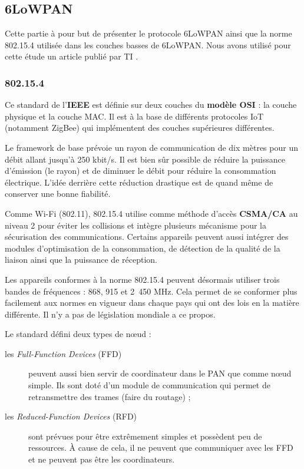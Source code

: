 
\subsection{6LoWPAN}

Cette partie à pour but de présenter le protocole 6LoWPAN ainsi que la norme 802.15.4 utilisée dans les couches basses de 6LoWPAN. Nous avons utilisé pour cette étude un article publié par TI \cite{demystified}.

\subsubsection{802.15.4}

Ce standard de l'\textbf{IEEE} est définie sur deux couches du \textbf{modèle OSI} : la couche physique et la couche MAC. Il est à la base de différents protocoles IoT (notamment ZigBee) qui implémentent des couches supérieures différentes. 

Le framework de base prévoie un rayon de communication de dix mètres pour un débit allant jusqu'à 250 kbit/s. Il est bien sûr possible de réduire la puissance d'émission (le rayon) et de diminuer le débit pour réduire la consommation électrique. L'idée derrière cette réduction drastique est de quand même de conserver une bonne fiabilité.

Comme Wi-Fi (802.11), 802.15.4 utilise comme méthode d’accès \textbf{CSMA/CA} au niveau 2 pour éviter les collisions et intègre plusieurs mécanisme pour la sécurisation des communications. Certains appareils peuvent aussi intégrer des modules d'optimisation de la consommation, de détection de la qualité de la liaison ainsi que la puissance de réception. 

Les appareils conformes à la norme 802.15.4 peuvent désormais utiliser trois bandes de fréquences : 868, 915 et 2~450 MHz. Cela permet de se conformer plus facilement aux normes en vigueur dans chaque pays qui ont des lois en la matière différente. Il n'y a pas de législation mondiale a ce propos.

Le standard défini deux types de nœud :

\begin{description}
	\item[les \textit{Full-Function Devices} (FFD)] peuvent aussi bien servir de coordinateur dans le PAN que comme nœud simple. Ils sont doté d'un module de communication qui permet de retransmettre des trames (faire du routage) ;
	\item[les \textit{Reduced-Function Devices} (RFD)] sont prévues pour être extrêmement simples et possèdent peu de ressources. À cause de cela, il ne peuvent que communiquer avec les FFD et ne peuvent pas être les coordinateurs.
\end{description}

